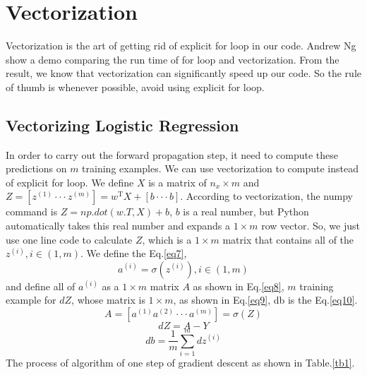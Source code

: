 \documentclass[a4paper]{article}
\begin{document}
\section{Vectorization}
Vectorization is the art of getting rid of explicit for loop in our
code. Andrew Ng show a demo comparing the run time of for loop and 
vectorization. From the result, we know that vectorization can 
significantly speed up our code. So the rule of thumb is whenever 
possible, avoid using explicit for loop.
\subsection{Vectorizing Logistic Regression}
In order to carry out the forward propagation step, it need to compute these predictions on $m$ training 
examples. We can use vectorization to compute instead 
of explicit for loop. We define $X$ is a matrix of
$n_x \times m$ and $Z=\left[z^{\left(1\right)}\cdot\cdot\cdot z^{\left(m\right)}\right]=w^\mathrm{T}X+\left[b\cdot\cdot\cdot b\right]$. According to vectorization, the 
numpy command is $Z = np.dot\left(w.T,X\right)+b$, 
$b$ is a real number, but Python automatically takes 
this real number and expands a $1\times m$ row vector.
So, we just use one line code to calculate $Z$, which is a $1\times m$ matrix that contains all of the 
$z^{\left(i\right)},i \in \left(1,m\right)$. We define the Eq.\ref{eq7},
\begin{equation}
a^{\left(i\right)} = \sigma\left(z^{\left(i\right)}\right),i \in \left(1,m\right)
\label{eq7}
\end{equation}
%
and define all of $a^{\left(i\right)}$ as a $1\times m$ matrix $A$ as shown in Eq.\ref{eq8}, $m$ training example for $dZ$, whose matrix is $1\times m$, as shown in Eq.\ref{eq9}, db is the Eq.\ref{eq10}.
%
\begin{equation}
A = \left[a^{\left(1\right)} a^{\left(2\right)}\cdot\cdot\cdot a^{\left(m\right)}\right]=\sigma\left(Z\right)
\label{eq8}
\end{equation}
%
\begin{equation}
dZ = A-Y
\label{eq9}
\end{equation} 
\begin{equation}
db = \frac{1}{m}\sum_{i=1}^{m}dz^{\left(i\right)}
\label{eq10}
\end{equation}
%
The process of algorithm \cite{dp} of one step of gradient descent as shown in Table.\ref{tb1}.
\end{document}

